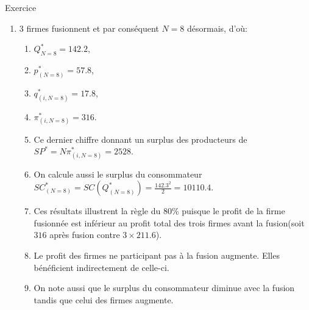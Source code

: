\begin{frame}[allowframebreaks]{Exercice}
\begin{enumerate}
        \item 3 firmes fusionnent et par conséquent $N=8$ désormais, d'où:
        \begin{enumerate}[$\star$]
            \item $Q^*_{N=8} = 142.2$, 
            \item $p^*_{(N=8)}=57.8$, 
            \item $q_{(i, N=8)}^* = 17.8$,  
            \item $\pi_{(i, N=8)}^*= 316$. 
            \item Ce dernier chiffre donnant un surplus des producteurs de 
            $SP^* = N\pi_{(i, N=8)}^*=2528$.
            \item On calcule aussi le surplus du consommateur  
            $SC_{(N=8)}^* = SC(Q_{(N=8)}^*) = \frac{142.3^2}{2} = 10110.4$.
            \framebreak
            \item Ces résultats illustrent la règle du 80\% puisque le profit de la firme fusionnée 
            est inférieur au profit total des trois firmes avant la fusion(soit $316$ 
            après fusion contre $3\times 211.6$). 
            \item Le profit des firmes ne participant pas à la fusion augmente. 
            Elles bénéficient indirectement de celle-ci.
            \item On note aussi que le surplus du consommateur diminue 
            avec la fusion tandis que celui des firmes augmente.
        \end{enumerate}


\end{enumerate}
\end{frame}
